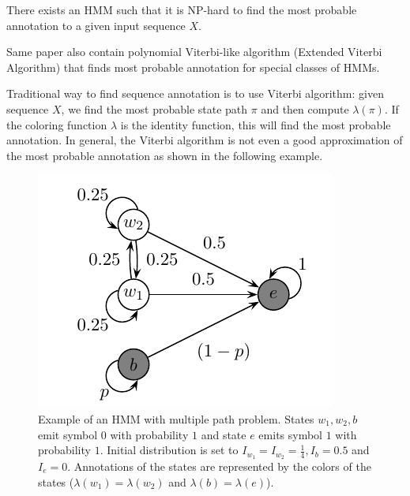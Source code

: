 \begin{theorem}
There exists an HMM such that it is NP-hard to find the most probable annotation
to a given input sequence $X$.
\end{theorem}

Same paper also contain polynomial Viterbi-like algorithm (Extended Viterbi
Algorithm) that finds most probable annotation for special classes of HMMs. 

Traditional way to find sequence annotation is to use Viterbi algorithm: given
sequence $X$, we find the most probable state path $\pi$ and then compute
$\lambda(\pi)$. If the  coloring function $\lambda$ is the identity function,
this will find the most probable annotation. In general, the Viterbi
algorithm is not even a good approximation of the most probable annotation as
shown in the following example.

\begin{figure}
\begin{center}
\includegraphics{../figures/multiplePathProblemHMM.pdf}
\end{center}
\caption[Hidden Markov Model with multiple path problem.]{Example of an HMM with
multiple path problem. States $w_1,w_2,b$ emit symbol $0$ with probability $1$
and state $e$ emits symbol $1$ with probability $1$. Initial distribution is set
to $I_{w_1}=I_{w_2}=\frac14, I_{b}=0.5$
and $I_e=0$. Annotations of the states are represented by the colors of the states
($\lambda(w_1)=\lambda(w_2)$ and $\lambda(b)=\lambda(e)$). }\label{FIGURE:BADVITERBIEXAMPLE}
\end{figure}

